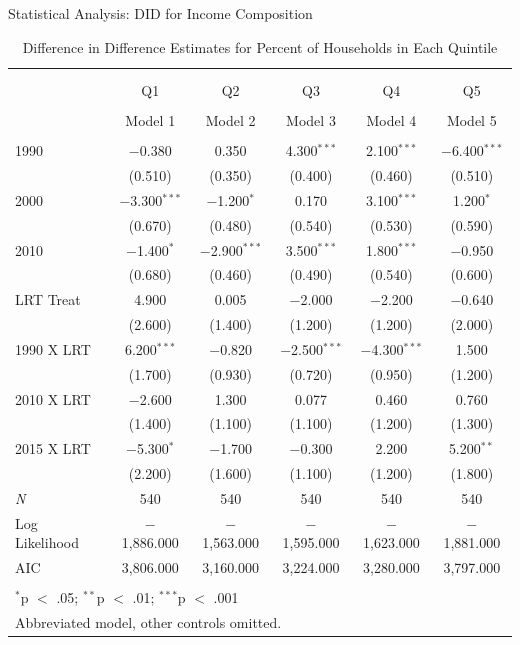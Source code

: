 \documentclass[11pt,ignorenonframetext,]{beamer}
\begin{document}
\begin{frame}{Statistical Analysis: DID for Income Composition}
\protect\hypertarget{statistical-analysis-did-for-income-composition}{}

\fontsize{5pt}{5}\selectfont

\begin{table}[!htbp] \centering 
  \caption{Difference in Difference Estimates for Percent of Households in Each Quintile} 
  \label{} 
\begin{tabular}{@{\extracolsep{5pt}}lccccc} 
\\[-1.8ex]\hline \\[-1.8ex] 
\\[-1.8ex] & Q1 & Q2 & Q3 & Q4 & Q5 \\ 
\\[-1.8ex] & Model 1 & Model 2 & Model 3 & Model 4 & Model 5\\ 
\hline \\[-1.8ex] 
 1990 & $-$0.380 & 0.350 & 4.300$^{***}$ & 2.100$^{***}$ & $-$6.400$^{***}$ \\ 
  & (0.510) & (0.350) & (0.400) & (0.460) & (0.510) \\ 
  2000 & $-$3.300$^{***}$ & $-$1.200$^{*}$ & 0.170 & 3.100$^{***}$ & 1.200$^{*}$ \\ 
  & (0.670) & (0.480) & (0.540) & (0.530) & (0.590) \\ 
  2010 & $-$1.400$^{*}$ & $-$2.900$^{***}$ & 3.500$^{***}$ & 1.800$^{***}$ & $-$0.950 \\ 
  & (0.680) & (0.460) & (0.490) & (0.540) & (0.600) \\ 
  LRT Treat & 4.900 & 0.005 & $-$2.000 & $-$2.200 & $-$0.640 \\ 
  & (2.600) & (1.400) & (1.200) & (1.200) & (2.000) \\ 
  1990 X LRT & 6.200$^{***}$ & $-$0.820 & $-$2.500$^{***}$ & $-$4.300$^{***}$ & 1.500 \\ 
  & (1.700) & (0.930) & (0.720) & (0.950) & (1.200) \\ 
  2010 X LRT & $-$2.600 & 1.300 & 0.077 & 0.460 & 0.760 \\ 
  & (1.400) & (1.100) & (1.100) & (1.200) & (1.300) \\ 
  2015 X LRT & $-$5.300$^{*}$ & $-$1.700 & $-$0.300 & 2.200 & 5.200$^{**}$ \\ 
  & (2.200) & (1.600) & (1.100) & (1.200) & (1.800) \\ 
 \textit{N} & 540 & 540 & 540 & 540 & 540 \\ 
Log Likelihood & $-$1,886.000 & $-$1,563.000 & $-$1,595.000 & $-$1,623.000 & $-$1,881.000 \\ 
AIC & 3,806.000 & 3,160.000 & 3,224.000 & 3,280.000 & 3,797.000 \\ 
\hline \\[-1.8ex] 
\multicolumn{6}{l}{$^{*}$p $<$ .05; $^{**}$p $<$ .01; $^{***}$p $<$ .001} \\ 
\multicolumn{6}{l}{Abbreviated model, other controls omitted.} \\ 
\end{tabular} 
\end{table}

\end{frame}
\end{document}
